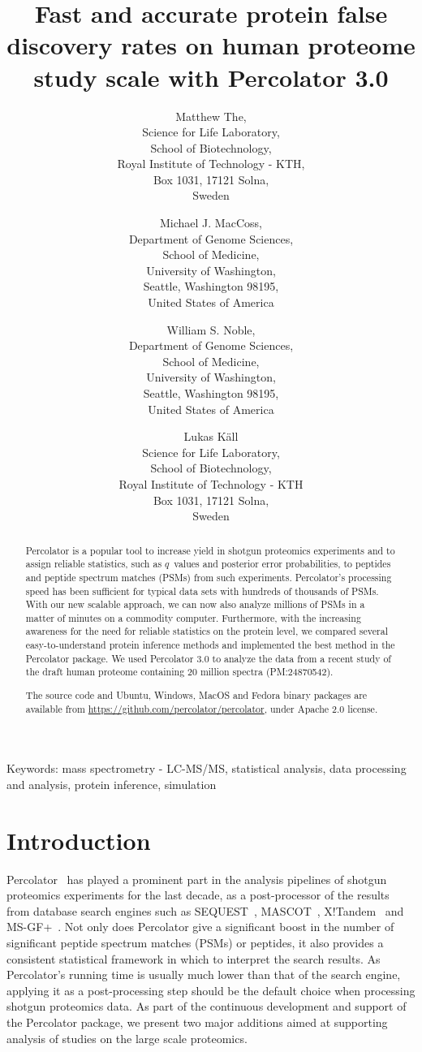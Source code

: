 \documentclass{article}
\title{Fast and accurate protein false discovery rates on human
proteome study scale with Percolator 3.0}
\author{Matthew The,\\
Science for Life Laboratory,\\
School of Biotechnology,\\
Royal Institute of Technology - KTH,\\
Box 1031, 17121 Solna,\\ Sweden
\and 
Michael J. MacCoss,\\
Department of Genome Sciences,\\
School of Medicine,\\
University of Washington,\\
Seattle, Washington 98195,\\ United States of America
\and 
William S. Noble,\\
Department of Genome Sciences,\\
School of Medicine,\\
University of Washington,\\
Seattle, Washington 98195,\\ United States of America
\and
Lukas K\"{a}ll\\
Science for Life Laboratory,\\ School of Biotechnology,\\
Royal Institute of Technology - KTH\\ 
Box 1031, 17121 Solna,\\ Sweden}
\begin{document}
\maketitle

\doublespacing

Keywords: mass spectrometry - LC-MS/MS, statistical analysis, 
data processing and analysis, protein inference, simulation


\newpage

\begin{abstract} 

Percolator is a popular tool to increase yield in shotgun proteomics
experiments and to assign reliable statistics, such as $q$~values and
posterior error probabilities, to peptides and peptide spectrum
matches (PSMs) from such experiments. Percolator's processing speed
has been sufficient for typical data sets with hundreds of thousands
of PSMs. With our new scalable approach, we can now also analyze
millions of PSMs in a matter of minutes on a commodity computer.
Furthermore, with the increasing awareness for the need for reliable
statistics on the protein level, we compared several
easy-to-understand protein inference methods and implemented the best
method in the Percolator package. We used Percolator 3.0 to analyze
the data from a recent study of the draft human proteome containing 20
million spectra (PM:24870542).

The source code and Ubuntu, Windows, MacOS and Fedora binary packages
are available from \url{https://github.com/percolator/percolator},
under Apache 2.0 license.
\end{abstract}

\newpage

\section*{Introduction}

Percolator~\cite{kall2007} has played a prominent part in the analysis
pipelines of shotgun proteomics experiments for the last decade, as a
post-processor of the results from database search engines such as
SEQUEST~\cite{eng1994}, MASCOT~\cite{cottrell1999},
X!Tandem~\cite{craig2004tandem} and MS-GF+~\cite{kim2008}. Not only
does Percolator give a significant boost in the number of significant
peptide spectrum matches (PSMs) or peptides, it also provides a
consistent statistical framework in which to interpret the search
results. As Percolator's running time is usually much lower than that
of the search engine, applying it as a post-processing step should be
the default choice when processing shotgun proteomics data. As part of
the continuous development and support of the Percolator package, we
present two major additions aimed at supporting analysis of studies on
the large scale proteomics.
\end{document}
